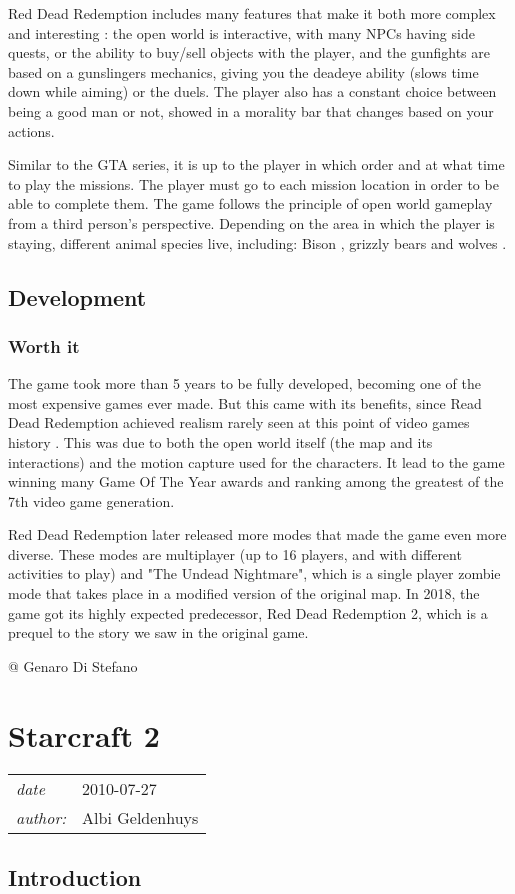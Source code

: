 \documentclass[a4paper,10pt]{book}
\newcommand{\pageHeader}[4]{
    \section{#1}
    \vspace{-0.3cm}
    \begin{table}[h!]
     \begin{tabular}{ll}
        \hline
        \textit{date} & #2 \\
        \textit{author: } & #3\\
        \hline
     \end{tabular}
    \end{table}
    \vspace{-0.3cm}
}
\begin{document}
      Red Dead Redemption includes many features that make it both more complex and interesting : the open world is interactive, with many NPCs having side quests, or the ability to buy/sell objects with the player, and the gunfights are based on a gunslingers mechanics, giving you the deadeye ability (slows time down while aiming) or the duels. The player also has a constant choice between being a good man or not, showed in a morality bar that changes based on your actions.
         
 Similar to the GTA series, it is up to the player in which order and at what time to play the missions. The player must go to each mission location in order to be able to complete them. The game follows the principle of open world gameplay from a third person's perspective. Depending on the area in which the player is staying, different animal species live, including: Bison , grizzly bears and wolves .   
 \subsection{Development }
 \subsubsection{Worth it }
 
          The game took more than 5 years to be fully developed, becoming one of the most expensive games ever made. But this came with its benefits, since Read Dead Redemption achieved realism rarely seen at this point of video games history . This was due to both the open world itself (the map and its interactions) and the motion capture used for the characters. It lead to the game winning many Game Of The Year awards and ranking among the greatest of the 7th video game generation.
         
 Red Dead Redemption later released more modes that made the game even more diverse. These modes are multiplayer (up to 16 players, and with different activities to play) and "The Undead Nightmare", which is a single player zombie mode that takes place in a modified version of the original map. In 2018, the game got its highly expected predecessor, Red Dead Redemption 2, which is a prequel to the story we saw in the original game. 
 
 @ Genaro Di Stefano 
 
 \newpage\pageHeader{Starcraft 2}{2010-07-27}{Albi Geldenhuys}{The RTS game that popularized esports}
 \subsection{Introduction }
 
\end{document}
